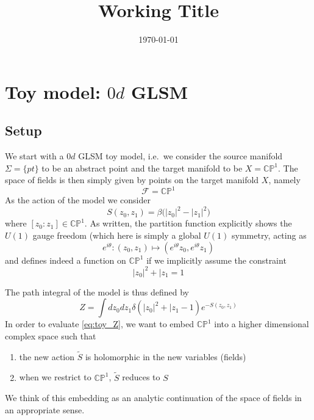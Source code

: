 \documentclass[a4paper,11pt]{article}
\title{Working Title}
\author{}
\date{\today}
\newcommand{\CP}{\mathbb{CP}}
\newcommand{\F}{\mathcal{F}}
\begin{document}
\maketitle

\tableofcontents

\section{Toy model: \texorpdfstring{$0d$ GLSM}{0d GLSM}}
\subsection{Setup}
We start with a $0d$ GLSM toy model, i.e.\ we consider the source manifold $\Sigma = \{ pt \}$ to be an abstract point and the target manifold to be $X = \CP^1$.
The space of fields is then simply given by points on the target manifold $X$, namely 
\begin{equation}
  \F = \CP^1
\end{equation}
As the action of the model we consider 
\begin{equation}
  S(z_0,z_1) = \beta \Big( \lvert z_0 \rvert^2 - \lvert z_1 \rvert^2 \Big)
  \label{eq:toy_S}
\end{equation}
where $[z_0:z_1] \in \CP^1$.
As written, the partition function explicitly shows the $U(1)$ gauge freedom (which here is simply a global $U(1)$ symmetry, acting as 
\begin{equation}
  e^{i\theta}\colon (z_0,z_1) \mapsto (e^{i\theta} z_0, e^{i\theta} z_1)
\end{equation}
and defines indeed a function on $\CP^1$ if we implicitly assume the constraint 
\begin{equation}
  \lvert z_0 \rvert^2 + \lvert z_1 = 1
  \label{eq:toy_constr}
\end{equation}

The path integral of the model is thus defined by 
\begin{equation}
Z = \int dz_0 dz_1 \delta(\lvert z_0 \rvert^2 + \lvert z_1 - 1) e^{-S(z_0,z_1)}
  \label{eq:toy_Z}
\end{equation}
In order to evaluate \eqref{eq:toy_Z}, we want to embed $\CP^1$ into a higher dimensional complex space such that 
\begin{enumerate}
  \item the new action $\tilde S$ is holomorphic in the new variables (fields)
  \item when we restrict to $\CP^1$, $\tilde S$ reduces to $S$
\end{enumerate}
We think of this embedding as an analytic continuation of the space of fields in an appropriate sense.
\end{document}

